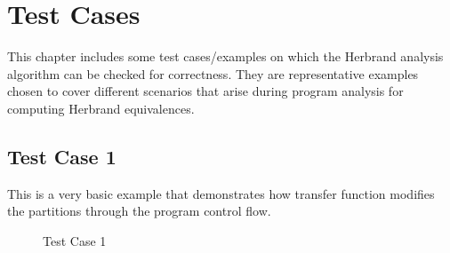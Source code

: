 \chapter{Test Cases}
\label{chap:chapter5}

This chapter includes some test cases/examples on which the Herbrand analysis
algorithm can be checked for correctness. They are representative examples 
chosen to cover different scenarios that arise during program analysis for 
computing Herbrand equivalences.

\section{Test Case 1}
\label{sec:tc1}
This is a very basic example that demonstrates how transfer function modifies the partitions through the program control flow.

\begin{figure}[H]
\label{fig:tc1}
    \caption{Test Case 1}
\end{figure}

